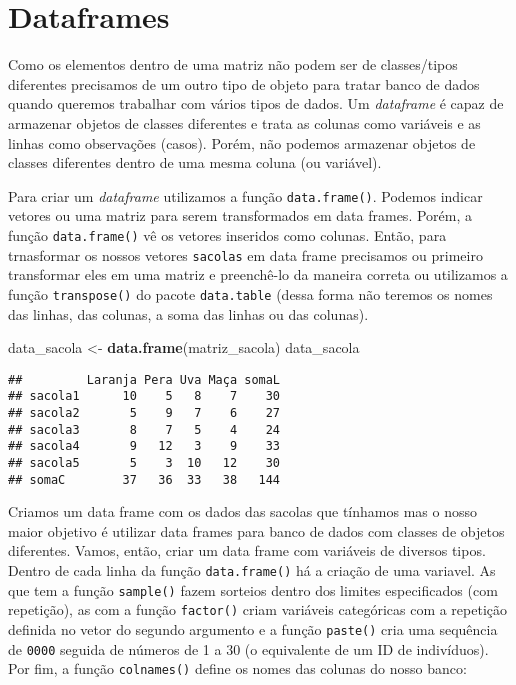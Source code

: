 \documentclass[]{book}
\newenvironment{Shaded}{\begin{snugshade}}{\end{snugshade}}
\newcommand{\KeywordTok}[1]{\textcolor[rgb]{0.13,0.29,0.53}{\textbf{#1}}}
\newcommand{\NormalTok}[1]{#1}
\newcommand{\StringTok}[1]{\textcolor[rgb]{0.31,0.60,0.02}{#1}}
\theoremstyle{definition}
\theoremstyle{definition}
\theoremstyle{definition}
\theoremstyle{remark}
\begin{document}
\hypertarget{dataframes}{%
\section{Dataframes}\label{dataframes}}

Como os elementos dentro de uma matriz não podem ser de classes/tipos diferentes precisamos de um outro tipo de objeto para tratar banco de dados quando queremos trabalhar com vários tipos de dados. Um \emph{dataframe} é capaz de armazenar objetos de classes diferentes e trata as colunas como variáveis e as linhas como observações (casos). Porém, não podemos armazenar objetos de classes diferentes dentro de uma mesma coluna (ou variável).

Para criar um \emph{dataframe} utilizamos a função \texttt{data.frame()}. Podemos indicar vetores ou uma matriz para serem transformados em data frames. Porém, a função \texttt{data.frame()} vê os vetores inseridos como colunas. Então, para trnasformar os nossos vetores \texttt{sacolas} em data frame precisamos ou primeiro transformar eles em uma matriz e preenchê-lo da maneira correta ou utilizamos a função \texttt{transpose()} do pacote \texttt{data.table} (dessa forma não teremos os nomes das linhas, das colunas, a soma das linhas ou das colunas).

\begin{Shaded}
\begin{Highlighting}[]
\NormalTok{data_sacola <-}\StringTok{ }\KeywordTok{data.frame}\NormalTok{(matriz_sacola)}
\NormalTok{data_sacola}
\end{Highlighting}
\end{Shaded}

\begin{verbatim}
##         Laranja Pera Uva Maça somaL
## sacola1      10    5   8    7    30
## sacola2       5    9   7    6    27
## sacola3       8    7   5    4    24
## sacola4       9   12   3    9    33
## sacola5       5    3  10   12    30
## somaC        37   36  33   38   144
\end{verbatim}

Criamos um data frame com os dados das sacolas que tínhamos mas o nosso maior objetivo é utilizar data frames para banco de dados com classes de objetos diferentes. Vamos, então, criar um data frame com variáveis de diversos tipos. Dentro de cada linha da função \texttt{data.frame()} há a criação de uma variavel. As que tem a função \texttt{sample()} fazem sorteios dentro dos limites especificados (com repetição), as com a função \texttt{factor()} criam variáveis categóricas com a repetição definida no vetor do segundo argumento e a função \texttt{paste()} cria uma sequência de \texttt{0000} seguida de números de 1 a 30 (o equivalente de um ID de indivíduos). Por fim, a função \texttt{colnames()} define os nomes das colunas do nosso banco:
\end{document}
